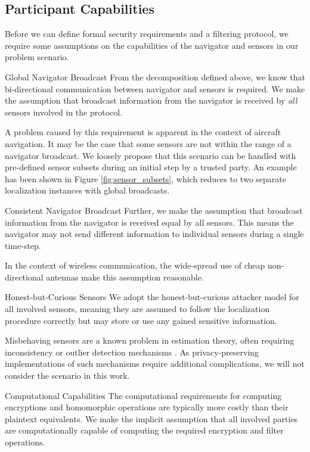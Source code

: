 \documentclass[10pt,letterpaper,oneside,twocolumn,journal]{IEEEtran}
\theoremstyle{definition}
\theoremstyle{definition}
\theoremstyle{remark}
\begin{document}
\subsection{Participant Capabilities} \label{subsec:capabilities}
Before we can define formal security requirements and a filtering protocol, we require some assumptions on the capabilities of the navigator and sensors in our problem scenario.
\begin{LaTeXdescription}
    \item[Global Navigator Broadcast] From the decomposition defined above, we know that bi-directional communication between navigator and sensors is required. We make the assumption that broadcast information from the navigator is received by \textit{all} sensors involved in the protocol.
    
    A problem caused by this requirement is apparent in the context of aircraft navigation. It may be the case that some sensors are not within the range of a navigator broadcast. We loosely propose that this scenario can be handled with pre-defined sensor subsets during an initial step by a trusted party. An example has been shown in Figure \ref{fig:sensor_subsets}, which reduces to two separate localization instances with global broadcasts.
    \item[Consistent Navigator Broadcast] Further, we make the assumption that broadcast information from the navigator is received equal by all sensors. This means the navigator may not send different information to individual sensors during a single time-step.
    
    In the context of wireless communication, the wide-spread use of cheap non-directional antennas make this assumption reasonable.
    \item[Honest-but-Curious Sensors] We adopt the honest-but-curious attacker model for all involved sensors, meaning they are assumed to follow the localization procedure correctly but may store or use any gained sensitive information. 
    
    Misbehaving sensors are a known problem in estimation theory, often requiring inconsistency or outlier detection mechanisms \cite{lazosSeRLocSecureRangeindependent2004,ben-galOutlierDetection2005}. As privacy-preserving implementations of such mechanisms require additional complications, we will not consider the scenario in this work.
    \item[Computational Capabilities] The computational requirements for computing encryptions and homomorphic operations are typically more costly than their plaintext equivalents. We make the implicit assumption that all involved parties are computationally capable of computing the required encryption and filter operations.
\end{LaTeXdescription}
\end{document}
